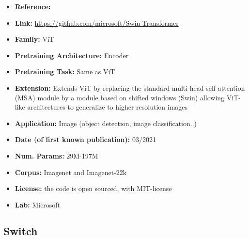 \documentclass{article}
\begin{document}
            \begin{itemize}
                \item \textbf{Reference:} 
                \item \textbf{Link:} \url{https://github.com/microsoft/Swin-Transformer}
                \item \textbf{Family:} ViT 
                \item \textbf{Pretraining Architecture:} Encoder
                \item \textbf{Pretraining Task:} Same as ViT
                \item \textbf{Extension:} Extends ViT by replacing the standard multi-head self attention (MSA) module by a module based on shifted windows (Swin) allowing ViT-like architectures to generalize to higher resolution images  
                \item \textbf{Application:} Image (object detection, image classification..)
                \item \textbf{Date (of first known publication):} 03/2021
                \item \textbf{Num. Params:} 29M-197M
                \item \textbf{Corpus:} Imagenet and Imagenet-22k
                \item \textbf{License:} the code is open sourced, with MIT-license
                \item \textbf{Lab:} Microsoft
            \end{itemize}

\subsection{Switch}
\end{document}

